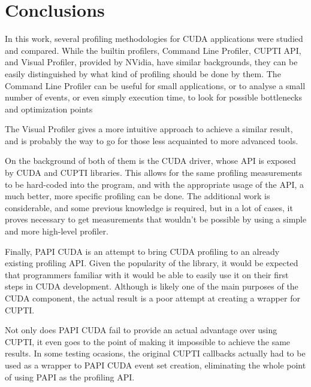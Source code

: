 \section{Conclusions}
\label{sec:anal}%


In this work, several profiling methodologies for CUDA applications were studied and compared. While the builtin profilers, Command Line Profiler, CUPTI API, and Visual Profiler, provided by NVidia, have similar backgrounds, they can be easily distinguished by what kind of profiling should be done by them. 
The Command Line Profiler can be useful for small applications, or to analyse a small number of events, or even simply execution time, to look for possible bottlenecks and optimization points

The Visual Profiler gives a more intuitive approach to achieve a similar result, and is probably the way to go for those less acquainted to more advanced tools.

On the background of both of them is the CUDA driver, whose API is exposed by CUDA and CUPTI libraries. This allows for the same profiling measurements to be hard-coded into the program, and with the appropriate usage of the API, a much better, more specific profiling can be done. The additional work is considerable, and some previous knowledge is required, but in a lot of cases, it proves necessary to get measurements that wouldn't be possible by using a simple and more high-level profiler.

Finally, PAPI CUDA is an attempt to bring CUDA profiling to an already existing profiling API. Given the popularity of the library, it would be expected that programmers familiar with it would be able to easily use it on their first steps in CUDA development. Although is likely one of the main purposes of the CUDA component, the actual result is a poor attempt at creating a wrapper for CUPTI.

Not only does PAPI CUDA fail to provide an actual advantage over using CUPTI, it even goes to the point of making it impossible to achieve the same results. In some testing ocasions, the original CUPTI callbacks actually had to be used as a wrapper to PAPI CUDA event set creation, eliminating the whole point of using PAPI as the profiling API.